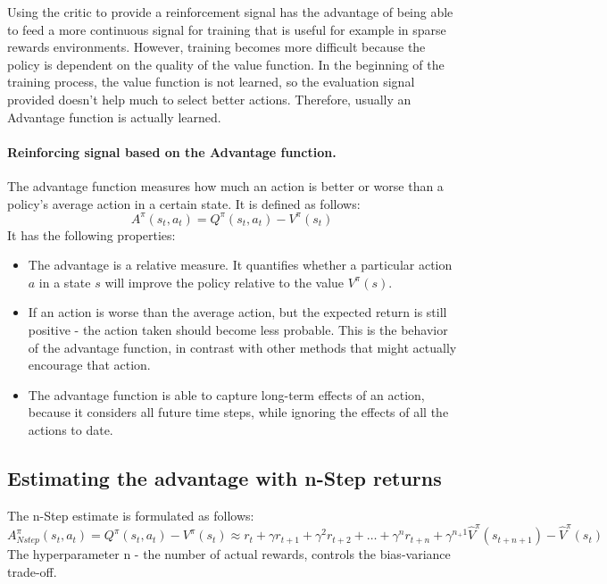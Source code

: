\documentclass[12pt,a4paper]{report}
\begin{document}
			Using the critic to provide a reinforcement signal has the advantage of being able to feed a more continuous signal for training that is useful for example in sparse rewards environments. However, training becomes more difficult because the policy is dependent on the quality of the value function. In the beginning of the training process, the value function is not learned, so the evaluation signal provided doesn't help much to select better actions. Therefore, usually an Advantage function is actually learned.
			\paragraph{Reinforcing signal based on the Advantage function.}
			The advantage function measures how much an action is better or worse than a policy's average action in a certain state. It is defined as follows:
			\begin{equation}
			A^\pi(s_t, a_t) = Q^\pi(s_t, a_t) - V^\pi(s_t)
			\end{equation}
			It has the following properties:
			\begin{itemize}
				\item The advantage is a relative measure. It quantifies whether a particular action $a$ in a state $s$ will improve the policy relative to the value $V^\pi(s)$.
				\item If an action is worse than the average action, but the expected return is still positive - the action taken should become less probable. This is the behavior of the advantage function, in contrast with other methods that might actually encourage that action.
				\item The advantage function is able to capture long-term effects of an action, because it considers all future time steps, while ignoring the effects of all the actions to date. 
			\end{itemize}
			\subsection{Estimating the advantage with n-Step returns}
			The n-Step estimate is formulated as follows:
			\begin{equation}
				A_{Nstep}^\pi (s_t, a_t) = Q^\pi(s_t, a_t) - V^\pi(s_t) \approx r_t + \gamma r_{t+1} + \gamma^2 r_{t+2} + \dots + \gamma^n r_{t + n} + \gamma^{n_+ 1} \hat{V}^\pi(s_{t+n + 1}) - \hat{V}^\pi(s_t)
			\end{equation}
			The hyperparameter n - the number of actual rewards, controls the bias-variance trade-off.
\end{document}
